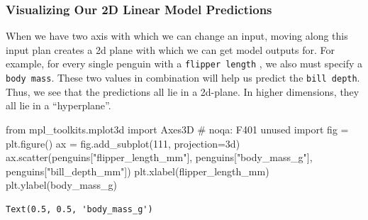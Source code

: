\documentclass[
  letterpaper,
  DIV=11,
  numbers=noendperiod]{scrreprt}
\newenvironment{Shaded}{\begin{snugshade}}{\end{snugshade}}
\newcommand{\CommentTok}[1]{\textcolor[rgb]{0.37,0.37,0.37}{#1}}
\newcommand{\DecValTok}[1]{\textcolor[rgb]{0.68,0.00,0.00}{#1}}
\newcommand{\ImportTok}[1]{\textcolor[rgb]{0.00,0.46,0.62}{#1}}
\newcommand{\NormalTok}[1]{\textcolor[rgb]{0.00,0.23,0.31}{#1}}
\newcommand{\OperatorTok}[1]{\textcolor[rgb]{0.37,0.37,0.37}{#1}}
\newcommand{\StringTok}[1]{\textcolor[rgb]{0.13,0.47,0.30}{#1}}
\begin{document}
\hypertarget{visualizing-our-2d-linear-model-predictions}{%
\subsubsection{Visualizing Our 2D Linear Model
Predictions}\label{visualizing-our-2d-linear-model-predictions}}

When we have two axis with which we can change an input, moving along
this input plan creates a 2d plane with which we can get model outputs
for. For example, for every single penguin with a
\texttt{flipper\ length} , we also must specify a \texttt{body\ mass}.
These two values in combination will help us predict the
\texttt{bill\ depth}. Thus, we see that the predictions all lie in a
2d-plane. In higher dimensions, they all lie in a ``hyperplane''.

\begin{Shaded}
\begin{Highlighting}[]
\ImportTok{from}\NormalTok{ mpl\_toolkits.mplot3d }\ImportTok{import}\NormalTok{ Axes3D  }\CommentTok{\# noqa: F401 unused import}
\NormalTok{fig }\OperatorTok{=}\NormalTok{ plt.figure()}
\NormalTok{ax }\OperatorTok{=}\NormalTok{ fig.add\_subplot(}\DecValTok{111}\NormalTok{, projection}\OperatorTok{=}\StringTok{\textquotesingle{}3d\textquotesingle{}}\NormalTok{)}
\NormalTok{ax.scatter(penguins[}\StringTok{"flipper\_length\_mm"}\NormalTok{], penguins[}\StringTok{"body\_mass\_g"}\NormalTok{], penguins[}\StringTok{"bill\_depth\_mm"}\NormalTok{])}
\NormalTok{plt.xlabel(}\StringTok{\textquotesingle{}flipper\_length\_mm\textquotesingle{}}\NormalTok{)}
\NormalTok{plt.ylabel(}\StringTok{\textquotesingle{}body\_mass\_g\textquotesingle{}}\NormalTok{)}
\end{Highlighting}
\end{Shaded}

\begin{verbatim}
Text(0.5, 0.5, 'body_mass_g')
\end{verbatim}
\end{document}
